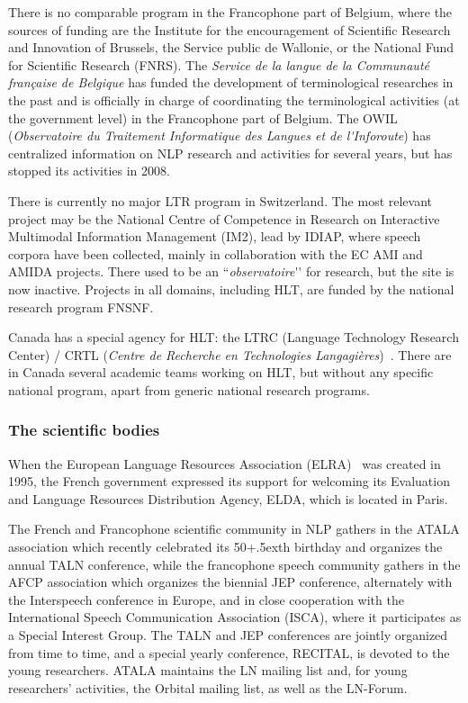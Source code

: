\begin{multicols}{2}
There is no comparable program in the Francophone part of Belgium,
where the sources of funding are the Institute for the encouragement
of Scientific Research and Innovation of Brussels, the Service public
de Wallonie, or the National Fund for Scientific Research (FNRS). The
{\em Service de la langue de la Communauté française de Belgique} has funded
the development of terminological researches in the past and is
officially in charge of coordinating the terminological activities (at
the government level) in the Francophone part of Belgium. The OWIL
({\em Observatoire du Traitement Informatique des Langues et de
l{\mbox '}Inforoute}) has centralized information on NLP research and
activities for several years, but has stopped its activities in 2008.

There is currently no major LTR program in Switzerland. The most
relevant project may be the National Centre of Competence in Research
on Interactive Multimodal Information Management (IM2), lead by IDIAP,
where speech corpora have been collected, mainly in collaboration with
the EC AMI and AMIDA projects. There used to be an ``{\em observatoire}{\mbox '}{\mbox '} for
research, but the site is now inactive. Projects in all domains,
including HLT, are funded by the national research program FNSNF.

Canada has a special agency for HLT: the LTRC (Language Technology
Research Center) / CRTL ({\em Centre de Recherche en Technologies
Langagières})~\cite{canadacrtl}. There are in Canada several academic teams working on
HLT, but without any specific national program, apart from generic
national research programs.

\subsubsection{The scientific bodies}

When the European Language Resources Association (ELRA)~\cite{elra} was created
in 1995, the French government expressed its support for welcoming its
Evaluation and Language Resources Distribution Agency, ELDA, which is
located in Paris.

The French and Francophone scientific community in NLP gathers in the
ATALA association which recently celebrated its 50\raise+.5ex\hbox{th} birthday and
organizes the annual TALN conference, while the francophone speech
community gathers in the AFCP association which organizes the biennial
JEP conference, alternately with the Interspeech conference in Europe,
and in close cooperation with the International Speech Communication
Association (ISCA), where it participates as a Special Interest
Group. The TALN and JEP conferences are jointly organized from time to
time, and a special yearly conference, RECITAL, is devoted to the
young researchers. ATALA maintains the LN mailing list and, for young
researchers’ activities, the Orbital mailing list, as well as the
LN-Forum.


\end{multicols}

